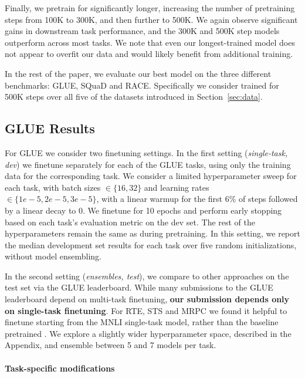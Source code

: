 

Finally, we pretrain \ourmodel{} for significantly longer, increasing the number of pretraining steps from 100K to 300K, and then further to 500K.
We again observe significant gains in downstream task performance, and the 300K and 500K step models outperform \xlnetlarge{} across most tasks.
We note that even our longest-trained model does not appear to overfit our data and would likely benefit from additional training.

In the rest of the paper, we evaluate our best \ourmodel{} model on the three different benchmarks: GLUE, SQuaD and RACE.
Specifically we consider \ourmodel{} trained for 500K steps over all five of the datasets introduced in Section~\ref{sec:data}.

\subsection{GLUE Results} \label{sec:results_glue}

For GLUE we consider two finetuning settings.
In the first setting (\emph{single-task, dev}) we finetune \ourmodel{} separately for each of the GLUE tasks, using only the training data for the corresponding task.
We consider a limited hyperparameter sweep for each task, with batch sizes $\in \{16, 32\}$ and learning rates $\in \{1e-5, 2e-5, 3e-5\}$, with a linear warmup for the first 6\% of steps followed by a linear decay to 0.
We finetune for 10 epochs and perform early stopping based on each task's evaluation metric on the dev set.
The rest of the hyperparameters remain the same as during pretraining.
In this setting, we report the median development set results for each task over five random initializations, without model ensembling.

In the second setting (\emph{ensembles, test}), we compare \ourmodel{} to other approaches on the test set via the GLUE leaderboard.
While many submissions to the GLUE leaderboard depend on multi-task finetuning, \textbf{our submission depends only on single-task finetuning}.
For RTE, STS and MRPC we found it helpful to finetune starting from the MNLI single-task model, rather than the baseline pretrained \ourmodel{}.
We explore a slightly wider hyperparameter space, described in the Appendix, and ensemble between 5 and 7 models per task.

\paragraph{Task-specific modifications}


